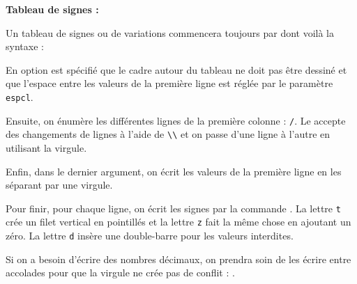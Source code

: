 {\NewFont
\begin{CenterExample}
    \textbf{Tableau de signes :}\par
\end{CenterExample}
}\bigskip

Un tableau de signes ou de variations commencera toujours par  dont voilà la syntaxe :
\begin{center}
\end{center}

 En option est spécifié que le cadre autour du tableau ne doit pas être dessiné et que l'espace entre les valeurs de la première ligne est réglée par le paramètre \verb!espcl!.

 Ensuite, on énumère les différentes lignes de la première colonne : \verb!/!. Le  accepte des changements de lignes à l'aide de \verb!\\! et on passe d'une ligne à l'autre en utilisant la virgule.

 Enfin, dans le dernier argument, on écrit les valeurs de la première ligne en les séparant par une virgule.\medskip

 Pour finir, pour chaque ligne, on écrit les signes par la commande . La lettre \verb!t! crée un filet vertical en pointillés et la lettre \verb!z! fait la même chose en ajoutant un zéro. La lettre \verb!d! insère une double-barre pour les valeurs interdites.

 \begin{info}
    Si on a besoin d'écrire des nombres décimaux, on prendra soin de les écrire entre accolades pour que la virgule ne crée pas de conflit : .
 \end{info}

